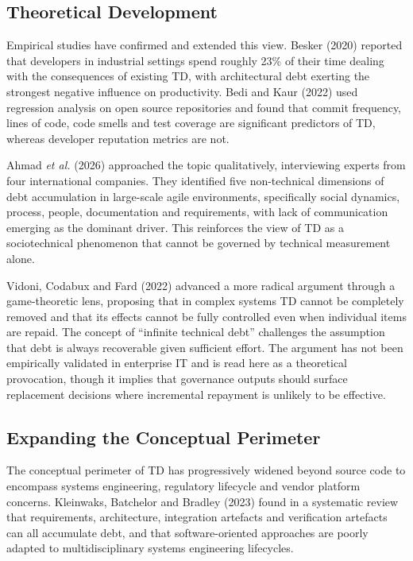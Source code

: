 \documentclass[
  12pt,
  letterpaper,
  12pt,
  oneside,
  english,
  onehalfspacing,
  headsepline]{MastersDoctoralThesis}
\begin{document}
\subsection{Theoretical Development}\label{theoretical-development}

Empirical studies have confirmed and extended this view. Besker (2020)
reported that developers in industrial settings spend roughly 23\% of
their time dealing with the consequences of existing TD, with
architectural debt exerting the strongest negative influence on
productivity. Bedi and Kaur (2022) used regression analysis on open
source repositories and found that commit frequency, lines of code, code
smells and test coverage are significant predictors of TD, whereas
developer reputation metrics are not.

Ahmad \emph{et al.} (2026) approached the topic qualitatively,
interviewing experts from four international companies. They identified
five non-technical dimensions of debt accumulation in large-scale agile
environments, specifically social dynamics, process, people,
documentation and requirements, with lack of communication emerging as
the dominant driver. This reinforces the view of TD as a sociotechnical
phenomenon that cannot be governed by technical measurement alone.

Vidoni, Codabux and Fard (2022) advanced a more radical argument through
a game-theoretic lens, proposing that in complex systems TD cannot be
completely removed and that its effects cannot be fully controlled even
when individual items are repaid. The concept of ``infinite technical
debt'' challenges the assumption that debt is always recoverable given
sufficient effort. The argument has not been empirically validated in
enterprise IT and is read here as a theoretical provocation, though it
implies that governance outputs should surface replacement decisions
where incremental repayment is unlikely to be effective.

\subsection{Expanding the Conceptual
Perimeter}\label{expanding-the-conceptual-perimeter}

The conceptual perimeter of TD has progressively widened beyond source
code to encompass systems engineering, regulatory lifecycle and vendor
platform concerns. Kleinwaks, Batchelor and Bradley (2023) found in a
systematic review that requirements, architecture, integration artefacts
and verification artefacts can all accumulate debt, and that
software-oriented approaches are poorly adapted to multidisciplinary
systems engineering lifecycles.
\end{document}

